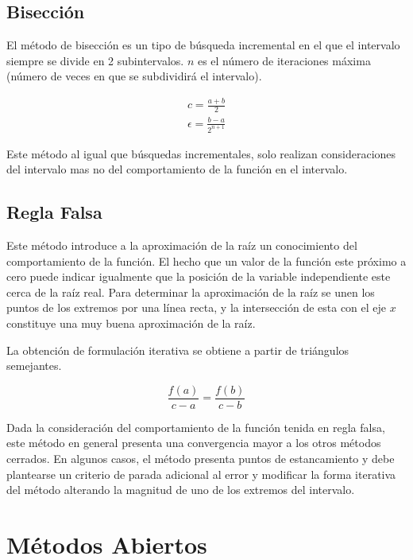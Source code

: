 \documentclass[letterpaper,10pt,oneside]{sphinxmanual}
\theoremstyle{plain}%
\theoremstyle{definition}%
\theoremstyle{remark}%
\begin{document}
\subsection{Bisección}
\noindent El método de bisección es un tipo de búsqueda incremental en el que el intervalo siempre se divide en 2 subintervalos. $n$ es el número de iteraciones máxima (número de veces en que se subdividirá el intervalo).\medskip

\begin{eqnarray}
 c=\frac{a+b}{2} \label{bis}\\
 \epsilon = \frac{b-a}{2^{n+1}} \nonumber
\end{eqnarray}

\noindent Este método al igual que búsquedas incrementales, solo realizan consideraciones del intervalo mas no del comportamiento de la función en el intervalo.\medskip

\subsection{Regla Falsa}
Este método introduce a la aproximación de la raíz un conocimiento del comportamiento de la función. El hecho que un valor de la función este próximo a cero puede indicar igualmente que la posición de la variable independiente este cerca de la raíz real. Para determinar la aproximación de la raíz se unen los puntos de los extremos por una línea recta, y la intersección de esta con el eje $x$ constituye una muy buena aproximación de la raíz.\medskip

\noindent La obtención de formulación iterativa se obtiene a partir de triángulos semejantes.\medskip

\begin{equation}
\frac{f(a)}{c-a}=\frac{f(b)}{c-b} \label{regfal}
\end{equation}

\noindent Dada la consideración del comportamiento de la función tenida en regla falsa, este método en general presenta una convergencia mayor a los otros métodos cerrados. En algunos casos, el método presenta puntos de estancamiento y debe plantearse un criterio de parada adicional al error y modificar la forma iterativa del método alterando la magnitud de uno de los extremos del intervalo.\medskip

\section{Métodos Abiertos}
\end{document}
